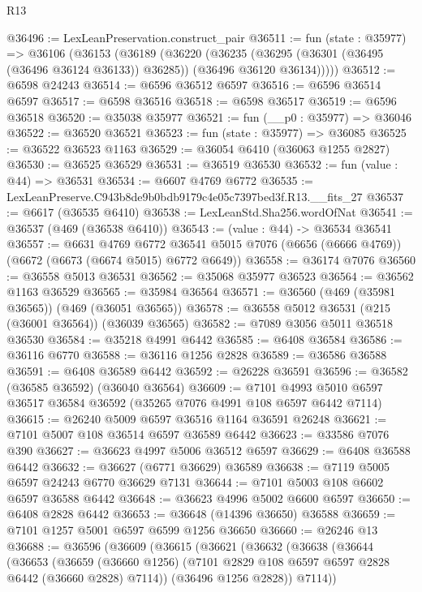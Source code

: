 \begin{lexlean}{R13}
\begin{coremodule}
@36496 := LexLeanPreservation.construct_pair
@36511 := fun (state : @35977) =>
  @36106
    (@36153
      (@36189
        (@36220
          (@36235
            (@36295 (@36301 (@36495 (@36496 @36124 @36133)) @36285))
            (@36496 @36120 @36134)))))
@36512 := @6598 @24243
@36514 := @6596 @36512 @6597
@36516 := @6596 @36514 @6597
@36517 := @6598 @36516
@36518 := @6598 @36517
@36519 := @6596 @36518
@36520 := @35038 @35977
@36521 := fun (__p0 : @35977) => @36046
@36522 := @36520 @36521
@36523 := fun (state : @35977) => @36085
@36525 := @36522 @36523 @1163
@36529 := @36054 @6410 (@36063 @1255 @2827)
@36530 := @36525 @36529
@36531 := @36519 @36530
@36532 := fun (value : @44) => @36531
@36534 := @6607 @4769 @6772
@36535 := LexLeanPreserve.C943b8de9b0bdb9179c4e05c7397bed3f.R13.__fits_27
@36537 := @6617 (@36535 @6410)
@36538 := LexLeanStd.Sha256.wordOfNat
@36541 := @36537 (@469 (@36538 @6410))
@36543 := (value : @44) -> @36534 @36541
@36557 := @6631
    @4769
    @6772
    @36541
    @5015
    @7076
    (@6656 (@6666 @4769))
    (@6672 (@6673 (@6674 @5015) @6772 @6649))
@36558 := @36174 @7076
@36560 := @36558 @5013 @36531
@36562 := @35068 @35977 @36523
@36564 := @36562 @1163 @36529
@36565 := @35984 @36564
@36571 := @36560 (@469 (@35981 @36565)) (@469 (@36051 @36565))
@36578 := @36558 @5012 @36531 (@215 (@36001 @36564)) (@36039 @36565)
@36582 := @7089 @3056 @5011 @36518 @36530
@36584 := @35218 @4991 @6442
@36585 := @6408 @36584
@36586 := @36116 @6770
@36588 := @36116 @1256 @2828
@36589 := @36586 @36588
@36591 := @6408 @36589 @6442
@36592 := @26228 @36591
@36596 := @36582 (@36585 @36592) (@36040 @36564)
@36609 := @7101 @4993 @5010 @6597 @36517 @36584 @36592 (@35265 @7076 @4991 @108 @6597 @6442 @7114)
@36615 := @26240 @5009 @6597 @36516 @1164 @36591 @26248
@36621 := @7101 @5007 @108 @36514 @6597 @36589 @6442
@36623 := @33586 @7076 @390
@36627 := @36623 @4997 @5006 @36512 @6597
@36629 := @6408 @36588 @6442
@36632 := @36627 (@6771 @36629) @36589
@36638 := @7119 @5005 @6597 @24243 @6770 @36629 @7131
@36644 := @7101 @5003 @108 @6602 @6597 @36588 @6442
@36648 := @36623 @4996 @5002 @6600 @6597
@36650 := @6408 @2828 @6442
@36653 := @36648 (@14396 @36650) @36588
@36659 := @7101 @1257 @5001 @6597 @6599 @1256 @36650
@36660 := @26246 @13
@36688 := @36596
    (@36609
      (@36615
        (@36621
          (@36632
            (@36638
              (@36644
                (@36653
                  (@36659
                    (@36660 @1256)
                    (@7101 @2829 @108 @6597 @6597 @2828 @6442 (@36660 @2828) @7114))
                  (@36496 @1256 @2828))
                @7114))

\end{coremodule}
\end{lexlean}
